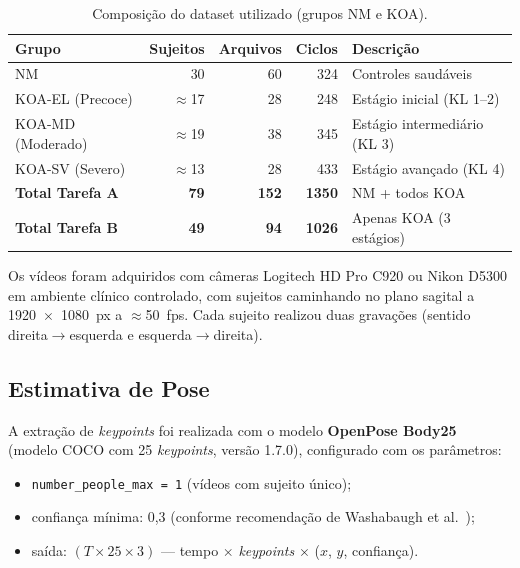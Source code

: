 \documentclass[a4paper,12pt]{article}
\begin{document}
\begin{table}[H]
  \centering
  \caption{Composição do dataset utilizado (grupos NM e KOA).}
  \label{tab:dataset}
  \begin{tabular}{@{}lrrrp{5.5cm}@{}}
    \toprule
    \textbf{Grupo} & \textbf{Sujeitos} & \textbf{Arquivos} &
    \textbf{Ciclos} & \textbf{Descrição} \\
    \midrule
    NM                & 30   & 60  & 324  & Controles saudáveis \\
    KOA-EL (Precoce)  & $\approx$17 & 28  & 248  & Estágio inicial (KL 1--2) \\
    KOA-MD (Moderado) & $\approx$19 & 38  & 345  & Estágio intermediário (KL 3) \\
    KOA-SV (Severo)   & $\approx$13 & 28  & 433  & Estágio avançado (KL 4) \\
    \midrule
    \textbf{Total Tarefa A} & \textbf{79} & \textbf{152} & \textbf{1350}
      & NM + todos KOA \\
    \textbf{Total Tarefa B} & \textbf{49} & \textbf{94} & \textbf{1026}
      & Apenas KOA (3 estágios) \\
    \bottomrule
  \end{tabular}
\end{table}

Os vídeos foram adquiridos com câmeras Logitech HD Pro C920 ou Nikon D5300 em
ambiente clínico controlado, com sujeitos caminhando no plano sagital a
1920~$\times$~1080~px a $\approx$50~fps. Cada sujeito realizou duas gravações
(sentido direita$\rightarrow$esquerda e esquerda$\rightarrow$direita).

\subsection{Estimativa de Pose}

A extração de \textit{keypoints} foi realizada com o modelo
\textbf{OpenPose Body25}~\cite{Cao2021} (modelo COCO com 25 \textit{keypoints},
versão 1.7.0), configurado com os parâmetros:

\begin{itemize}
  \item \texttt{number\_people\_max = 1} (vídeos com sujeito único);
  \item confiança mínima: 0,3 (conforme recomendação de Washabaugh et
        al.~\cite{Washabaugh2022});
  \item saída: $(T \times 25 \times 3)$ --- tempo $\times$ \textit{keypoints}
        $\times$ ($x$, $y$, confiança).
\end{itemize}
\end{document}
